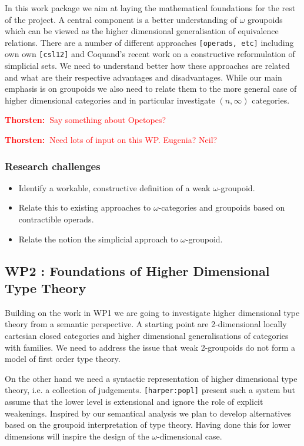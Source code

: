 \documentclass[a4paper]{article}
\newcommand{\txa}[1]{\textcolor{red}{\textbf{Thorsten:~}#1}}
\renewcommand{\cite}[1]{{\tt[#1]}}
\begin{document}
In this work package we aim at laying the mathematical foundations for
the rest of the project. A central component is a better understanding
of $\omega$ groupoids which can be viewed as the higher dimensional
generalisation of equivalence relations. There are a number of
different approaches \cite{operads, etc} including own own
\cite{csl12} and Coquand's recent work on a constructive reformulation
of simplicial sets. We need to understand better how these approaches
are related and what are their respective advantages and
disadvantages. While our main emphasis is on groupoids we also need to
relate them to the more general case of higher dimensional categories
and in particular investigate $(n,\infty)$ categories.

\txa{Say something about Opetopes?}

\txa{Need lots of input on this WP. Eugenia? Neil?}

\subsubsection*{Research challenges}
\label{sec:rsearch-challenges}
\begin{itemize}
\item Identify a workable, constructive definition of a weak
$\omega$-groupoid.
\item Relate this to existing approaches to $\omega$-categories and
  groupoids based on contractible operads.
\item Relate the notion the simplicial approach to $\omega$-groupoid.
\end{itemize}


\subsection*{WP2 : Foundations of Higher Dimensional Type Theory}

Building on the work in WP1 we are going to investigate higher
dimensional type theory from a semantic perspective. A starting point
are 2-dimensional locally cartesian closed categories and
higher dimensional generalisations of categories with families. We
need to address the issue that weak 2-groupoids do not form a model of
first order type theory. 

On the other hand we need a syntactic representation of higher
dimensional type theory, i.e. a collection of
judgements. \cite{harper:popl} present such a system but assume that
the lower level is extensional and ignore the role of explicit
weakenings. Inspired by our semantical analysis we plan to develop
alternatives based on the groupoid interpretation of type theory.
Having done this for lower dimensions will inspire the design of
the $\omega$-dimensional case.
\end{document}

